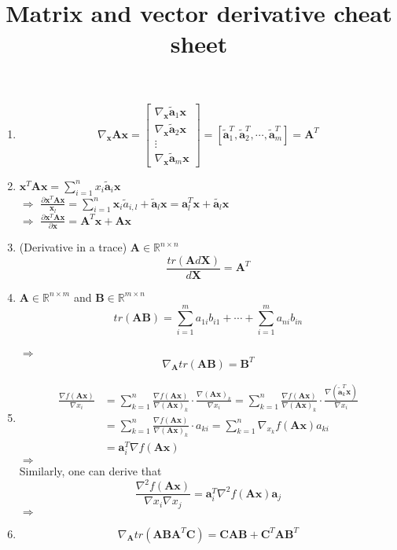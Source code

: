 \documentclass[onecolumn]{IEEEtran}
\begin{document}
	\title{Matrix and vector derivative cheat sheet}
	\author{
	}
	\maketitle
 \begin{enumerate}
 	\item \[\nabla_{\mathbf{x}}\mathbf{Ax}=\left[\begin{matrix}
 		\nabla_{\mathbf{x}}\tilde{\mathbf{a}}_1\mathbf{x}\\\nabla_{\mathbf{x}}\tilde{\mathbf{a}}_2\mathbf{x}\\\vdots\\\nabla_{\mathbf{x}}\tilde{\mathbf{a}}_m\mathbf{x}
 	\end{matrix}\right]=[\tilde{\mathbf{a}}_1^T,\tilde{\mathbf{a}}_2^T,\cdots,\tilde{\mathbf{a}}_m^T]=\mathbf{A}^T\]
 \item $\mathbf{x}^T\mathbf{Ax}=\sum\limits_{i=1}^nx_i\tilde{\mathbf{a}}_i\mathbf{x}$\\
 $\Rightarrow$ $\frac{\partial \mathbf{x}^T\mathbf{Ax}}{\mathbf{x}_l}=\sum_{i=1}^n\mathbf{x}_i\tilde{a}_{i,l}+\tilde{\mathbf{a}}_l\mathbf{x}=\mathbf{a}_l^T\mathbf{x}+\tilde{\mathbf{a}_l}\mathbf{x}$\\
 $\Rightarrow$ $\frac{\partial\mathbf{x}^T\mathbf{Ax}}{\partial \mathbf{x}}=\mathbf{A}^T\mathbf{x}+\mathbf{Ax}$
 \item (Derivative in a trace) $\mathbf{A}\in\mathbb{R}^{n\times n}$
 \[\boxed{\frac{tr(\mathbf{A}d\mathbf{X})}{d\mathbf{X}}=\mathbf{A}^T}\]
 \item $\mathbf{A}\in\mathbb{R}^{n\times m}$ and $\mathbf{B}\in\mathbb{R}^{m\times n}$
 \[tr(\mathbf{AB})=\sum\limits_{i=1}^ma_{1i}b_{i1}+\cdots+\sum\limits_{i=1}^ma_{ni}b_{in}\]\\
 $\Rightarrow$
 \[\boxed{\nabla_{\mathbf{A}}tr(\mathbf{AB})=\mathbf{B}^T}\]
 \item \begin{equation}
 	\begin{split}
 		\frac{\nabla f(\mathbf{Ax})}{\nabla x_i}&=\sum\limits_{k=1}^n\frac{\nabla f(\mathbf{Ax})}{\nabla(\mathbf{Ax})_k}\cdot\frac{\nabla(\mathbf{Ax})_k}{\nabla x_i}=\sum\limits_{k=1}^n\frac{\nabla f(\mathbf{Ax})}{\nabla(\mathbf{Ax})_k}\cdot\frac{\nabla(\tilde{\mathbf{a}}_k^T\mathbf{x})}{\nabla x_i}\\
 		&=\sum\limits_{k=1}^n\frac{\nabla f(\mathbf{Ax})}{\nabla(\mathbf{Ax})_k}\cdot a_{ki}=\sum\limits_{k=1}^n\nabla_{x_k}f(\mathbf{Ax})a_{ki}\\
 		&=\mathbf{a}_i^T\nabla f(\mathbf{Ax})
 	\end{split}
 \end{equation}
$\Rightarrow$  \\
Similarly, one can derive that 
\[\frac{\nabla^2f(\mathbf{Ax})}{\nabla x_i\nabla x_j} = \mathbf{a}_i^T\nabla^2f(\mathbf{Ax})\mathbf{a}_j \]
$\Rightarrow$  
\item \[\nabla_{\mathbf{A}}tr(\mathbf{AB}\mathbf{A}^T\mathbf{C})=\mathbf{CAB}+\mathbf{C}^T\mathbf{AB}^T\]
 \end{enumerate}
	\clearpage
\end{document}
